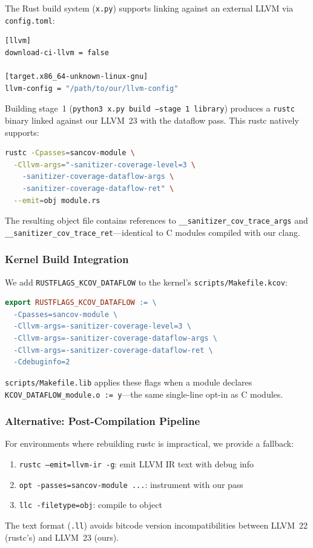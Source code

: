 \documentclass{ndss}
\begin{document}
The Rust build system (\texttt{x.py}) supports linking against an external LLVM
via \texttt{config.toml}:
\begin{lstlisting}[language=bash,numbers=none]
[llvm]
download-ci-llvm = false

[target.x86_64-unknown-linux-gnu]
llvm-config = "/path/to/our/llvm-config"
\end{lstlisting}

Building stage~1 (\texttt{python3 x.py build --stage 1 library}) produces a
\texttt{rustc} binary linked against our LLVM~23 with the dataflow pass. This
rustc natively supports:
\begin{lstlisting}[language=bash,numbers=none]
rustc -Cpasses=sancov-module \
  -Cllvm-args="-sanitizer-coverage-level=3 \
    -sanitizer-coverage-dataflow-args \
    -sanitizer-coverage-dataflow-ret" \
  --emit=obj module.rs
\end{lstlisting}

The resulting object file contains references to
\texttt{\_\_sanitizer\_cov\_trace\_args} and
\texttt{\_\_sanitizer\_cov\_trace\_ret}---identical to C modules compiled with
our clang.

\subsubsection{Kernel Build Integration}

We add \texttt{RUSTFLAGS\_KCOV\_DATAFLOW} to the kernel's
\texttt{scripts/Makefile.kcov}:
\begin{lstlisting}[language=make,numbers=none]
export RUSTFLAGS_KCOV_DATAFLOW := \
  -Cpasses=sancov-module \
  -Cllvm-args=-sanitizer-coverage-level=3 \
  -Cllvm-args=-sanitizer-coverage-dataflow-args \
  -Cllvm-args=-sanitizer-coverage-dataflow-ret \
  -Cdebuginfo=2
\end{lstlisting}

\texttt{scripts/Makefile.lib} applies these flags when a module declares
\texttt{KCOV\_DATAFLOW\_module.o := y}---the same single-line opt-in as C
modules.

\subsubsection{Alternative: Post-Compilation Pipeline}

For environments where rebuilding rustc is impractical, we provide a fallback:
\begin{enumerate}[nosep]
  \item \texttt{rustc --emit=llvm-ir -g}: emit LLVM IR text with debug info
  \item \texttt{opt -passes=sancov-module ...}: instrument with our pass
  \item \texttt{llc -filetype=obj}: compile to object
\end{enumerate}
The text format (\texttt{.ll}) avoids bitcode version incompatibilities between
LLVM~22 (rustc's) and LLVM~23 (ours).
\end{document}
